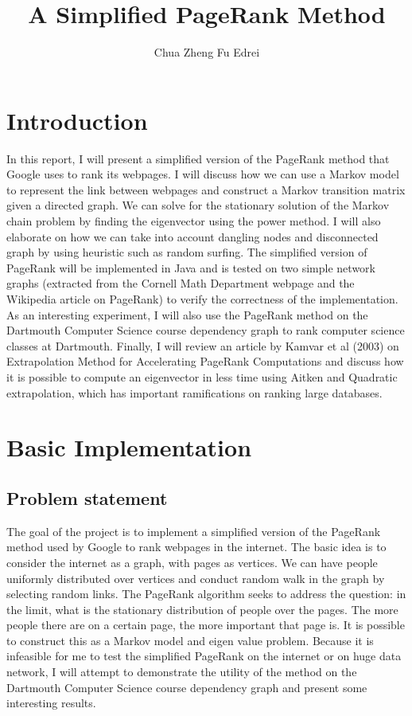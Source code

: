 \documentclass[9.5pt]{extarticle}
\title{A Simplified PageRank Method}
\author{Chua Zheng Fu Edrei}
\begin{document}
\maketitle

\section{Introduction}

In this report, I will present a simplified version of the PageRank method that Google uses to rank its webpages. I will discuss how we can use a Markov model to represent the link between webpages and construct a Markov transition matrix given a directed graph. We can solve for the stationary solution of the Markov chain problem by finding the eigenvector using the power method. I will also elaborate on how we can take into account dangling nodes and disconnected graph by using heuristic such as random surfing. The simplified version of PageRank will be implemented in Java and is tested on two simple network graphs (extracted from the Cornell Math Department webpage and the Wikipedia article on PageRank) to verify the correctness of the implementation. As an interesting experiment, I will also use the PageRank method on the Dartmouth Computer Science course dependency graph to rank computer science classes at Dartmouth. Finally, I will review an article by Kamvar et al (2003) on Extrapolation Method for Accelerating PageRank Computations and discuss how it is possible to compute an eigenvector in less time using Aitken and Quadratic extrapolation, which has important ramifications on ranking large databases.

\section{Basic Implementation}

\subsection{Problem statement}

The goal of the project is to implement a simplified version of the PageRank method used by Google to rank webpages in the internet. The basic idea is to consider the internet as a graph, with pages as vertices. We can have people uniformly distributed over vertices and conduct random walk in the graph by selecting random links. The PageRank algorithm seeks to address the question: in the limit, what is the stationary distribution of people over the pages. The more people there are on a certain page, the more important that page is. It is possible to construct this as a Markov model and eigen value problem. Because it is infeasible for me to test the simplified PageRank on the internet or on huge data network, I will attempt to demonstrate the utility of the method on the Dartmouth Computer Science course dependency graph and present some interesting results.
\end{document}
